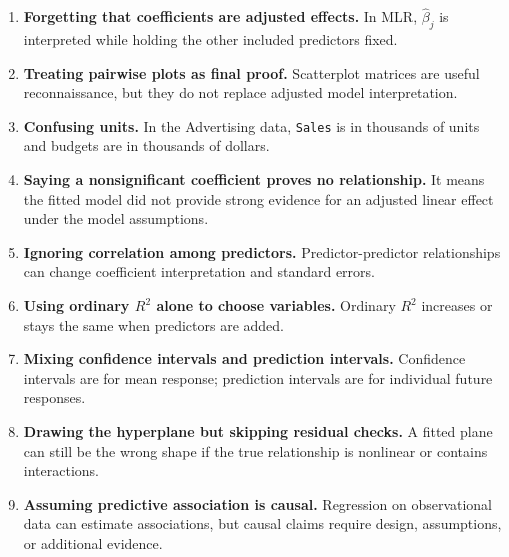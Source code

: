 \begin{enumerate}
  \item \textbf{Forgetting that coefficients are adjusted effects.}  In MLR, \(\widehat{\beta}_j\) is interpreted while holding the other included predictors fixed.
  \item \textbf{Treating pairwise plots as final proof.}  Scatterplot matrices are useful reconnaissance, but they do not replace adjusted model interpretation.
  \item \textbf{Confusing units.}  In the Advertising data, \texttt{Sales} is in thousands of units and budgets are in thousands of dollars.
  \item \textbf{Saying a nonsignificant coefficient proves no relationship.}  It means the fitted model did not provide strong evidence for an adjusted linear effect under the model assumptions.
  \item \textbf{Ignoring correlation among predictors.}  Predictor-predictor relationships can change coefficient interpretation and standard errors.
  \item \textbf{Using ordinary \(R^2\) alone to choose variables.}  Ordinary \(R^2\) increases or stays the same when predictors are added.
  \item \textbf{Mixing confidence intervals and prediction intervals.}  Confidence intervals are for mean response; prediction intervals are for individual future responses.
  \item \textbf{Drawing the hyperplane but skipping residual checks.}  A fitted plane can still be the wrong shape if the true relationship is nonlinear or contains interactions.
  \item \textbf{Assuming predictive association is causal.}  Regression on observational data can estimate associations, but causal claims require design, assumptions, or additional evidence.
\end{enumerate}

